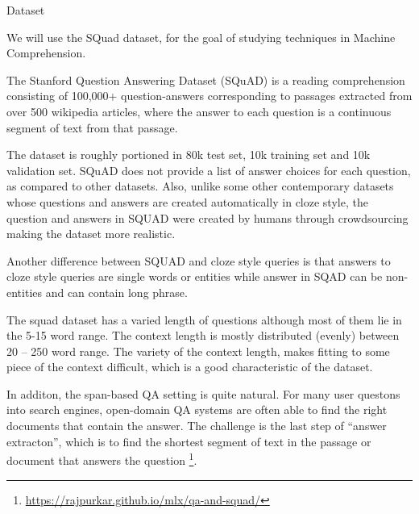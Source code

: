 \documentclass{article}
\begin{document}
\begin{psection}{Dataset}

	We will use the SQuad \citep{squad} dataset, for the goal of studying techniques in Machine Comprehension.

	The Stanford Question Answering Dataset (SQuAD) is a reading comprehension consisting of 100,000+ question-answers corresponding to passages extracted from over 500 wikipedia articles, where the answer to each question is a continuous segment of text from that passage.

	The dataset is roughly portioned in 80k test set, 10k training set and 10k validation set.
	SQuAD does not provide a list of answer choices for each question, as compared to other datasets.
	Also, unlike some other contemporary datasets whose questions and answers are created automatically in cloze style, the question and answers in SQUAD were created by humans through crowdsourcing making the dataset more realistic.

	Another difference between SQUAD and cloze style queries is that answers to cloze style queries are single words or entities while answer in SQAD can be non-entities and can contain long phrase.

	The squad dataset has a varied length of questions although most of them lie in the 5-15 word range.
	The context length is mostly distributed (evenly) between 20 -- 250 word range.
	The variety of the context length, makes fitting to some piece of the context difficult, which is a good characteristic of the dataset.

	In additon, the span-based QA setting is quite natural.
	For many user questons into search engines, open-domain QA systems are often able to find the right documents that contain the answer.
	The challenge is the last step of ``answer extracton'', which is to find the shortest segment of text in the passage or document that answers the question \footnote{\url{https://rajpurkar.github.io/mlx/qa-and-squad/}}.

\end{psection}
\end{document}
